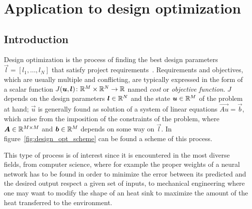 



\section{Application to design optimization}


\subsection{Introduction}

Design optimization is the process of finding the best design parameters $\vec{l} = [l_1, \dots, l_N]$ that satisfy project requirements~\cite{Matlab:design_opt}. Requirements and objectives, which are usually multiple and conflicting, are typically expressed in the form of a scalar function $J(\boldsymbol{u},\boldsymbol{l}) \colon \mathbb{R}^M\times\mathbb{R}^N \to \mathbb{R}$ named \emph{cost} or \emph{objective function}. $J$ depends on the design parameters $\boldsymbol{l} \in \mathbb{R}^N$ and the state $\boldsymbol{u} \in \mathbb{R}^M$ of the problem at hand; $\vec{u}$ is generally found as solution of a system of linear equations $\vec{Au} = \vec{b}$, which arise from the imposition of the constraints of the problem, where $\boldsymbol{A} \in \mathbb{R}^{M \times M}$ and $\boldsymbol{b} \in \mathbb{R}^M$ depends on some way on $\vec{l}$. In figure~\ref{fig:design_opt_scheme} can be found a scheme of this process.

This type of process is of interest since it is encountered in the most diverse fields, from computer science, where for example the proper weights of a neural network has to be found in order to minimize the error between its predicted and the desired output respect a given set of inputs, to mechanical engineering where one may want to modify the shape of an heat sink to maximize the amount of the heat transferred to the environment.

